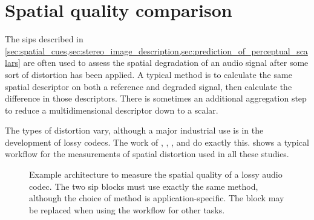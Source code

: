 \section{Spatial quality comparison}

The \glspl{sip} described in \cref{sec:spatial_cues,sec:stereo_image_description,sec:prediction_of_perceptual_scalars} are often used to assess the spatial degradation of an audio signal after some sort of distortion has been applied. A typical method is to calculate the same spatial descriptor on both a reference and degraded signal, then calculate the difference in those descriptors. There is sometimes an additional aggregation step to reduce a multidimensional descriptor down to a scalar.

The types of distortion vary, although a major industrial use is in the development of lossy codecs. The work of , , , and  do exactly this.  shows a typical workflow for the measurements of spatial distortion used in all these studies.

\begin{figure}[htb]
    \centering
    \caption{Example architecture to measure the spatial quality of a lossy audio codec. The two \gls{sip} blocks must use exactly the same method, although the choice of method is application-specific. The  block may be replaced when using the workflow for other tasks.}
    \label{fig:spatial_distortion}
\end{figure}

